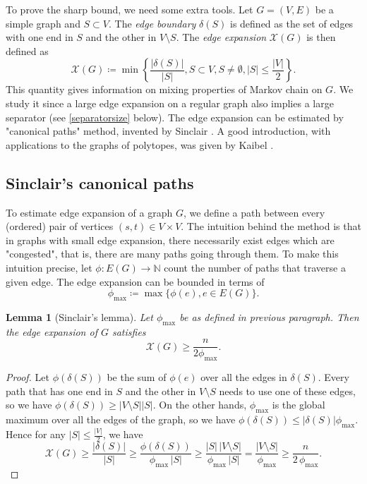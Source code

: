 \documentclass[a4paper,12pt]{book}
\theoremstyle{plain}
\newtheorem{lemma}[theorem]{Lemma}
\theoremstyle{definition}
\begin{document}
To prove the sharp bound, we need some extra tools. Let $G= (V,E)$ be a simple graph and
 $S\subset V$. The \textit{edge boundary} $\delta(S)$ is defined as the set of edges with one end
in $S$ and the other in $V\setminus S$. The \textit{edge expansion} $\mathcal{X}(G)$ is then defined
as 
\begin{equation}
\mathcal{X}(G) \coloneqq  \min \left\{ \frac{ |\delta(S) |}{ |S |}, S \subset V, S\neq \emptyset, |S| \leq \frac{ |V |}{2}  \right\}.
\end{equation} 
This quantity gives information on mixing properties of Markov chain on $G$. We study it since
a large edge expansion on a regular graph also implies a large separator (see \ref{separatorsize} below).
The edge expansion can be estimated by "canonical paths" method, invented by Sinclair \cite{Sinclair}. 
A good introduction, with applications to the graphs of polytopes, was given by Kaibel \cite{Kaibel}. 

\subsection{Sinclair's canonical paths}

To estimate edge expansion of a graph $G$, we define a path between every (ordered) pair of vertices $(s,t) \in V \times V$.
The intuition behind the method is that in graphs with small edge expansion, there necessarily exist edges which are "congested", that is, there
are many paths going through them. To make this intuition precise, let $\phi: E(G) \rightarrow \mathbb{N}$ count the number of paths
that traverse a given edge. The edge expansion can be bounded 
in terms of
\begin{equation}
\phi_{\max} \coloneqq \max \{ \phi(e), e \in E(G) \}.
\end{equation}


\begin{lemma}[Sinclair's lemma]
\label{Sinclair}
Let $\phi_{\max}$ be as defined in previous paragraph. Then the edge expansion of $G$ satisfies 
\begin{equation}
\mathcal{X}(G) \ge \frac{n}{2 \phi_{\max}}.
\end{equation}
\end{lemma}

\begin{proof}
Let $\phi(\delta(S))$ be the sum of $\phi(e)$ over all the edges in $\delta(S)$. Every path that has one end in $S$
and the other in $V\setminus S$ needs to use one of these edges, so we have $\phi(\delta(S)) \ge   |V\setminus S | |S |$.
On the other hands, $\phi_{\max}$ is the global maximum over all the edges of the graph, so we have $\phi(\delta(S)) \le  |\delta(S) |\phi_{\max}$.
Hence for any $|S| \le \frac{ |V |}{2}$, we have
\begin{equation}
\label{sepbound}
 \mathcal{X}(G) \ge \frac{|\delta(S)|}{|S|} 
                \ge \frac{\phi(\delta(S))}{\phi_{\max}\,|S|}
                \ge \frac{|S|\,|V{\setminus}S|}{\phi_{\max}\,|S|}
                 =  \frac{|V{\setminus}S|}{\phi_{\max}}
				\ge \frac{n}{2\,\phi_{\max}}.
\end{equation}
\end{proof} 
\end{document}
